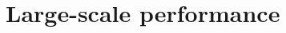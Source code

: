 \documentclass[letterpaper]{llncs}
\begin{document}



\section{Large-scale performance} \label{sect:large-scale}
\end{document}
